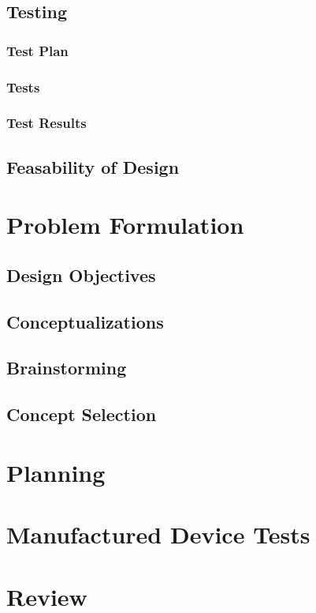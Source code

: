 \documentclass{article}
\begin{document}
\subsection{Testing}
\subsubsection{Test Plan}


\pagebreak

\subsubsection{Tests}


\subsubsection{Test Results}


\subsection{Feasability of Design} %


\newpage
\appendix
\appendixpage

\section{Problem Formulation}
\subsection{Design Objectives}


\subsection{Conceptualizations}

\subsection{Brainstorming}

\subsection{Concept Selection}

\pagebreak

\section{Planning}

\pagebreak

\section{Manufactured Device Tests}


\section{Review}
\end{document}
